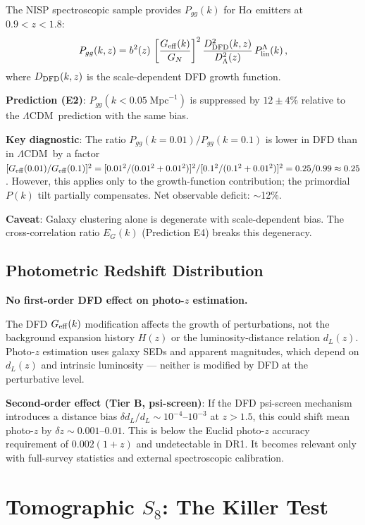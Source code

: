 \documentclass[11pt,a4paper]{article}
\newcommand{\LCDM}{$\Lambda$CDM}
\newcommand{\Geff}{G_{\rm eff}}
\begin{document}
The NISP spectroscopic sample provides $P_{gg}(k)$ for H$\alpha$
emitters at $0.9 < z < 1.8$:
\begin{equation}
P_{gg}(k,z) = b^2(z)\,\left[\frac{\Geff(k)}{G_N}\right]^2
  \frac{D^2_{\rm DFD}(k,z)}{D^2_\Lambda(z)}\,P_{\rm lin}^\Lambda(k)\,,
\end{equation}
where $D_{\rm DFD}(k,z)$ is the scale-dependent DFD growth function.

\textbf{Prediction (E2)}: $P_{gg}(k < 0.05\;\text{Mpc}^{-1})$ is
suppressed by $12 \pm 4\%$ relative to the \LCDM\ prediction with the
same bias.

\textbf{Key diagnostic}: The ratio $P_{gg}(k=0.01)/P_{gg}(k=0.1)$
is lower in DFD than in \LCDM\ by a factor
$[\Geff(0.01)/\Geff(0.1)]^2 = [0.01^2/(0.01^2+0.01^2)]^2/[0.1^2/(0.1^2+0.01^2)]^2
= 0.25/0.99 \approx 0.25$. However, this applies only to the
growth-function contribution; the primordial $P(k)$ tilt partially
compensates. Net observable deficit: $\sim$12\%.

\textbf{Caveat}: Galaxy clustering alone is degenerate with scale-dependent
bias. The cross-correlation ratio $E_G(k)$ (Prediction E4) breaks this
degeneracy.


\subsection{Photometric Redshift Distribution}

\textbf{No first-order DFD effect on photo-$z$ estimation.}

The DFD $\Geff(k)$ modification affects the growth of perturbations,
not the background expansion history $H(z)$ or the luminosity-distance
relation $d_L(z)$. Photo-$z$ estimation uses galaxy SEDs and apparent
magnitudes, which depend on $d_L(z)$ and intrinsic luminosity --- neither
is modified by DFD at the perturbative level.

\textbf{Second-order effect (Tier B, psi-screen)}: If the DFD
psi-screen mechanism introduces a distance bias
$\delta d_L/d_L \sim 10^{-4}$--$10^{-3}$ at $z > 1.5$, this could
shift mean photo-$z$ by $\delta z \sim 0.001$--$0.01$. This is below
the Euclid photo-$z$ accuracy requirement of $0.002(1+z)$ and
undetectable in DR1. It becomes relevant only with full-survey
statistics and external spectroscopic calibration.


\section{Tomographic $S_8$: The Killer Test}
\label{sec:tomographic}
\end{document}
